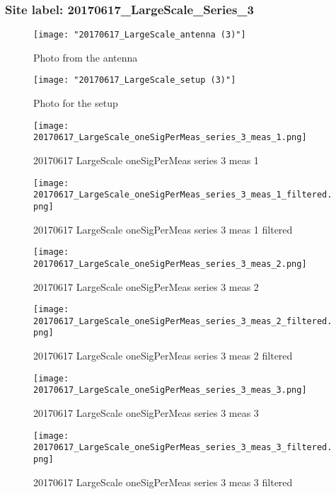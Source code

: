 \subsubsection{Site label: 20170617\_LargeScale\_Series\_3}
\begin{figure}[ht] \caption{Photo from the antenna}
\texttt{[image: "20170617\_LargeScale\_antenna (3)"]}\centering\end{figure}
\begin{figure}[ht] \caption{Photo for the setup}
\texttt{[image: "20170617\_LargeScale\_setup (3)"]}\centering\end{figure}
\begin{figure}[ht] \caption{20170617 LargeScale oneSigPerMeas series 3 meas 1}
\texttt{[image: 20170617\_LargeScale\_oneSigPerMeas\_series\_3\_meas\_1.png]}\centering\end{figure}
\begin{figure}[ht] \caption{20170617 LargeScale oneSigPerMeas series 3 meas 1 filtered}
\texttt{[image: 20170617\_LargeScale\_oneSigPerMeas\_series\_3\_meas\_1\_filtered.png]}\centering\end{figure}
\begin{figure}[ht] \caption{20170617 LargeScale oneSigPerMeas series 3 meas 2}
\texttt{[image: 20170617\_LargeScale\_oneSigPerMeas\_series\_3\_meas\_2.png]}\centering\end{figure}
\begin{figure}[ht] \caption{20170617 LargeScale oneSigPerMeas series 3 meas 2 filtered}
\texttt{[image: 20170617\_LargeScale\_oneSigPerMeas\_series\_3\_meas\_2\_filtered.png]}\centering\end{figure}
\begin{figure}[ht] \caption{20170617 LargeScale oneSigPerMeas series 3 meas 3}
\texttt{[image: 20170617\_LargeScale\_oneSigPerMeas\_series\_3\_meas\_3.png]}\centering\end{figure}
\begin{figure}[ht] \caption{20170617 LargeScale oneSigPerMeas series 3 meas 3 filtered}
\texttt{[image: 20170617\_LargeScale\_oneSigPerMeas\_series\_3\_meas\_3\_filtered.png]}\centering\end{figure}
\clearpage
